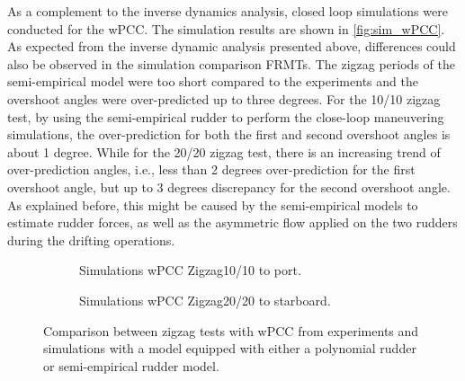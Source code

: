 \noindent As a complement to the inverse dynamics analysis, closed loop simulations were conducted for the wPCC. The simulation results are shown in \autoref{fig:sim_wPCC}. As expected from the inverse dynamic analysis presented above, differences could also be observed in the simulation comparison FRMTs. 
The zigzag periods of the semi-empirical model were too short compared to the experiments and the overshoot angles were over-predicted up to three degrees. For the 10/10 zigzag test, by using the semi-empirical rudder to perform the close-loop maneuvering simulations, the over-prediction for both the first and second overshoot angles is about 1 degree. While for the 20/20 zigzag test, there is an increasing trend of over-prediction angles, i.e., less than 2 degrees over-prediction for the first overshoot angle, but up to 3 degrees discrepancy for the second overshoot angle. As explained before, this might be caused by the semi-empirical models to estimate rudder forces, as well as the asymmetric flow applied on the two rudders during the drifting operations.
\begin{figure}[h]
     \centering
     \begin{subfigure}[b]{\textwidth}
         \centering
         
        \caption{Simulations wPCC Zigzag10/10 to port.}
        \label{fig:sim_wPCC_10}
     \end{subfigure}
     \vfill
     \begin{subfigure}[b]{\textwidth}
        \centering
        
        \caption{Simulations wPCC Zigzag20/20 to starboard.}
        \label{fig:sim_wPCC_20}
     \end{subfigure}
        \caption{Comparison between zigzag tests with wPCC from experiments and simulations with a model equipped with either a polynomial rudder or semi-empirical rudder model.}
        \label{fig:sim_wPCC}
\end{figure}
%         
%         
%     
